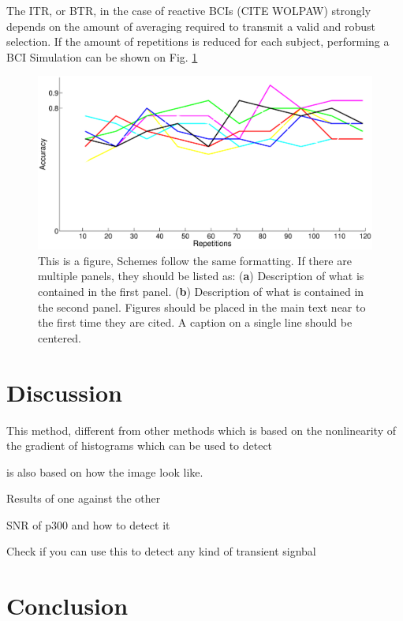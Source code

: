 \documentclass[entropy,article,submit,moreauthors,pdftex,10pt,a4paper]{mdpi}
\begin{document}
The ITR, or BTR, in the case of reactive BCIs (CITE WOLPAW) strongly depends on the amount of averaging required to transmit a valid and robust selection.  If the amount of repetitions is reduced for each subject, performing a BCI Simulation can be shown on Fig. \ref{fig:singletrial}


\begin{figure}[H]
\centering
\includegraphics[width=18cm]{singletriality.eps}
\caption{This is a figure, Schemes follow the same formatting. If there are multiple panels, they should be listed as: (\textbf{a}) Description of what is contained in the first panel. (\textbf{b}) Description of what is contained in the second panel. Figures should be placed in the main text near to the first time they are cited. A caption on a single line should be centered.}
\label{fig:singletrial}
\end{figure}

\section{Discussion}

This method, different from other methods which is based on the nonlinearity of the gradient of histograms which can be used to detect 

is also based on how the image look like.

Results of one against the other

SNR of p300 and how to detect it

Check if you can use this to detect any kind of transient signbal


\section{Conclusion}
\end{document}
